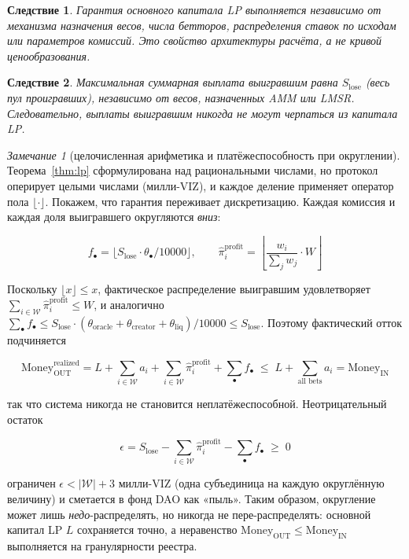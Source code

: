 \documentclass{ledger}
\theoremstyle{plain}
\newtheorem{corollary}{Следствие}
\theoremstyle{remark}
\newtheorem*{remark}{Замечание}
\begin{document}
\begin{corollary}
Гарантия основного капитала LP выполняется независимо от механизма назначения
весов, числа бетторов, распределения ставок по исходам или параметров комиссий.
Это свойство архитектуры расчёта, а не кривой ценообразования.
\end{corollary}

\begin{corollary}
Максимальная суммарная выплата выигравшим равна $S_{\text{lose}}$ (весь пул
проигравших), независимо от весов, назначенных AMM или LMSR. Следовательно, выплаты
выигравшим никогда не могут черпаться из капитала LP.
\end{corollary}

\begin{remark}[целочисленная арифметика и платёжеспособность при округлении]
Теорема~\ref{thm:lp} сформулирована над рациональными числами, но протокол
оперирует целыми числами (милли-VIZ), и каждое деление применяет оператор пола
$\lfloor \cdot \rfloor$. Покажем, что гарантия переживает дискретизацию. Каждая
комиссия и каждая доля выигравшего округляются \emph{вниз}:

\[
f_\bullet = \lfloor S_{\text{lose}} \cdot \theta_\bullet / 10000 \rfloor, \qquad
\hat{\pi}_i^{\text{profit}} = \left\lfloor \frac{w_i}{\sum_{j} w_j} \cdot W
\right\rfloor
\]

Поскольку $\lfloor x \rfloor \leq x$, фактическое распределение выигравшим
удовлетворяет $\sum_{i \in \mathcal{W}} \hat{\pi}_i^{\text{profit}} \leq W$, и
аналогично $\sum_\bullet f_\bullet \leq S_{\text{lose}} \cdot (\theta_{\text{oracle}} +
\theta_{\text{creator}} + \theta_{\text{liq}})/10000 \leq S_{\text{lose}}$. Поэтому
фактический отток подчиняется

\[
\text{Money}_{\text{OUT}}^{\text{realized}} = L + \sum_{i \in \mathcal{W}} a_i +
\sum_{i \in \mathcal{W}} \hat{\pi}_i^{\text{profit}} + \sum_\bullet f_\bullet
\;\leq\; L + \sum_{\text{all bets}} a_i = \text{Money}_{\text{IN}}
\]

так что система никогда не становится неплатёжеспособной. Неотрицательный остаток

\[
\epsilon = S_{\text{lose}} - \sum_{i \in \mathcal{W}}
\hat{\pi}_i^{\text{profit}} - \sum_\bullet f_\bullet \;\geq\; 0
\]

ограничен $\epsilon < |\mathcal{W}| + 3$ милли-VIZ (одна субъединица на каждую
округлённую величину) и сметается в фонд DAO как «пыль». Таким образом, округление
может лишь \emph{недо}-распределять, но никогда не пере-распределять: основной
капитал LP $L$ сохраняется точно, а неравенство $\text{Money}_{\text{OUT}} \leq
\text{Money}_{\text{IN}}$ выполняется на гранулярности реестра.
\end{remark}
\end{document}
